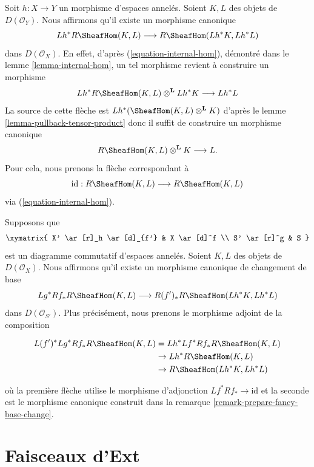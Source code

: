 \begin{remark}

\label{remark-prepare-fancy-base-change}

Soit $h : X \to Y$ un morphisme d'espaces annelés. Soient $K, L$ des objets de $D(\mathcal{O}_Y)$. Nous affirmons qu'il existe un morphisme canonique
$$
Lh^*R\SheafHom(K, L) \longrightarrow R\SheafHom(Lh^*K, Lh^*L)
$$
dans $D(\mathcal{O}_X)$. En effet, d'après (\ref{equation-internal-hom}), démontré dans le lemme \ref{lemma-internal-hom},
un tel morphisme revient à construire un morphisme
$$
Lh^*R\SheafHom(K, L) \otimes^\mathbf{L} Lh^*K \longrightarrow Lh^*L
$$
La source de cette flèche est $Lh^*(\SheafHom(K, L) \otimes^\mathbf{L} K)$
d'après le lemme \ref{lemma-pullback-tensor-product}
donc il suffit de construire un morphisme canonique
$$
R\SheafHom(K, L) \otimes^\mathbf{L} K \longrightarrow L.
$$
Pour cela, nous prenons la flèche correspondant à
$$
\text{id} :
R\SheafHom(K, L)
\longrightarrow
R\SheafHom(K, L)
$$
via (\ref{equation-internal-hom}).

\end{remark}

\begin{remark}

\label{remark-fancy-base-change}

Supposons que
$$
\xymatrix{
X' \ar[r]_h \ar[d]_{f'} &
X \ar[d]^f \\
S' \ar[r]^g &
S
}
$$
est un diagramme commutatif d'espaces annelés. Soient $K, L$ des objets de $D(\mathcal{O}_X)$. Nous affirmons qu'il existe un morphisme canonique de changement de base
$$
Lg^*Rf_*R\SheafHom(K, L)
\longrightarrow
R(f')_*R\SheafHom(Lh^*K, Lh^*L)
$$
dans $D(\mathcal{O}_{S'})$. Plus précisément, nous prenons le morphisme adjoint de la composition

\begin{align*}
L(f')^*Lg^*Rf_*R\SheafHom(K, L)
& =
Lh^*Lf^*Rf_*R\SheafHom(K, L) \\
& \to
Lh^*R\SheafHom(K, L) \\
& \to
R\SheafHom(Lh^*K, Lh^*L)
\end{align*}

où la première flèche utilise le morphisme d'adjonction
$Lf^*Rf_* \to \text{id}$ et la seconde est le morphisme canonique construit dans la remarque \ref{remark-prepare-fancy-base-change}.

\end{remark}
\section{Faisceaux d'Ext}

